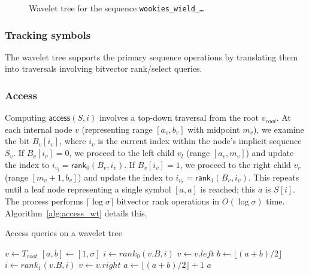 \begin{figure}[h]
    \caption{\small Wavelet tree for the sequence \texttt{wookies\_wield\_\dots}} \label{fig:wavelet_tree_example}
\end{figure}

\subsubsection*{Tracking symbols}
The wavelet tree supports the primary sequence operations by translating them into traversals involving bitvector rank/select queries.

\subsubsection{Access}
Computing $\textsf{access}(S, i)$ involves a top-down traversal from the root $v_{root}$. At each internal node $v$ (representing range $[a_v, b_v]$ with midpoint $m_v$), we examine the bit $B_v[i_v]$, where $i_v$ is the current index within the node's implicit sequence $S_v$. If $B_v[i_v] = 0$, we proceed to the left child $v_l$ (range $[a_v, m_v]$) and update the index to $i_{v_l} = \textsf{rank}_0(B_v, i_v)$. If $B_v[i_v] = 1$, we proceed to the right child $v_r$ (range $[m_v+1, b_v]$) and update the index to $i_{v_r} = \textsf{rank}_1(B_v, i_v)$. This repeats until a leaf node representing a single symbol $[a, a]$ is reached; this $a$ is $S[i]$. The process performs $\lceil \log \sigma \rceil$ bitvector \textsf{rank} operations in $O(\log \sigma)$ time. Algorithm~\ref{alg:access_wt} details this.

\begin{algorithm}[h!]
    \caption{\textsf{Access} queries on a wavelet tree}\label{alg:access_wt}
    \small
    \begin{algorithmic}
         
        \State $v \gets T_{root}$ 
        \State $[a,b] \gets [1,\sigma]$
         
        \State $i \gets rank_0(v.B,i)$
        \State $v \gets v.left$ 
        \State $b \gets \lfloor (a+b)/2 \rfloor$
        \Else
        \State $i \gets rank_1(v.B,i)$
        \State $v \gets v.right$ 
        \State $a \gets \lfloor (a+b)/2 \rfloor +1$
        \EndIf
        \EndWhile
        \State \Return $a$
        \EndFunction
    \end{algorithmic}
\end{algorithm}


